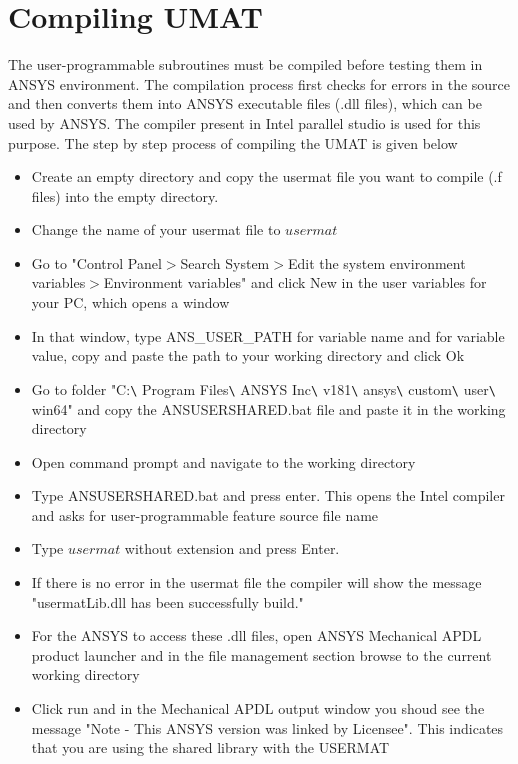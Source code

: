 \documentclass[a4paper,12pt,twoside]{report}
\begin{document}
\section{Compiling UMAT}
\indent\indent\indent The user-programmable subroutines must be compiled before testing them in ANSYS environment. The compilation process first checks for errors in the source and then converts them into ANSYS executable files (.dll files), which can be used by ANSYS. The compiler present in Intel parallel studio is used for this purpose. The step by step process of compiling the UMAT is given below
\begin{itemize}
\item Create an empty directory and copy the usermat file you want to compile (.f files) into the empty directory.
\item Change the name of your usermat file to $usermat$
\item Go to "Control Panel$>$Search System$>$Edit the system environment variables$>$Environment variables" and click New in the user variables for your PC, which opens a window
\item In that window, type ANS\_USER\_PATH for variable name and for variable value, copy and paste the path to your working directory and click Ok
\item Go to folder "C:\texttt{\textbackslash} Program Files\texttt{\textbackslash} ANSYS Inc\texttt{\textbackslash} v181\texttt{\textbackslash} ansys\texttt{\textbackslash} custom\texttt{\textbackslash} user\texttt{\textbackslash} win64" and copy the ANSUSERSHARED.bat file and paste it in the working directory
\item Open command prompt and navigate to the working directory
\item Type ANSUSERSHARED.bat and press enter. This opens the Intel compiler and asks for user-programmable feature source file name
\item Type $usermat$ without extension and press Enter.
\item If there is no error in the usermat file the compiler will show the message "usermatLib.dll has been successfully build."  
\item For the ANSYS to access these .dll files, open ANSYS Mechanical APDL product launcher and in the file management section browse to the current working directory
\item Click run and in the Mechanical APDL output window you shoud see the message "Note - This ANSYS version was linked by Licensee". This indicates that you are using the shared library with the USERMAT\\
\end{itemize} 
\end{document}
